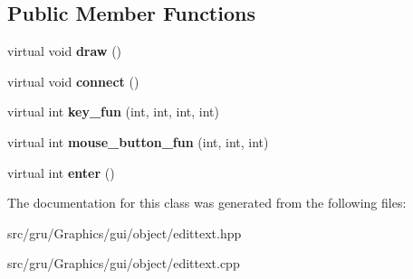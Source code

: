 \subsection*{\-Public \-Member \-Functions}
\begin{DoxyCompactItemize}
\item 
\hypertarget{classglutpp_1_1gui_1_1object_1_1edittext_a6667510174711dd4718f8f8b07b89a6e}{virtual void {\bfseries draw} ()}\label{classglutpp_1_1gui_1_1object_1_1edittext_a6667510174711dd4718f8f8b07b89a6e}

\item 
\hypertarget{classglutpp_1_1gui_1_1object_1_1edittext_aacbbfc6f239db6356d83de334f6b0bdc}{virtual void {\bfseries connect} ()}\label{classglutpp_1_1gui_1_1object_1_1edittext_aacbbfc6f239db6356d83de334f6b0bdc}

\item 
\hypertarget{classglutpp_1_1gui_1_1object_1_1edittext_a88d4a62bd971978e1b60711859b4390d}{virtual int {\bfseries key\-\_\-fun} (int, int, int, int)}\label{classglutpp_1_1gui_1_1object_1_1edittext_a88d4a62bd971978e1b60711859b4390d}

\item 
\hypertarget{classglutpp_1_1gui_1_1object_1_1edittext_ae7decbc3c95b939cd78d782c48702bec}{virtual int {\bfseries mouse\-\_\-button\-\_\-fun} (int, int, int)}\label{classglutpp_1_1gui_1_1object_1_1edittext_ae7decbc3c95b939cd78d782c48702bec}

\item 
\hypertarget{classglutpp_1_1gui_1_1object_1_1edittext_a654792733884b42cba054e6a84894876}{virtual int {\bfseries enter} ()}\label{classglutpp_1_1gui_1_1object_1_1edittext_a654792733884b42cba054e6a84894876}

\end{DoxyCompactItemize}


\-The documentation for this class was generated from the following files\-:\begin{DoxyCompactItemize}
\item 
src/gru/\-Graphics/gui/object/edittext.\-hpp\item 
src/gru/\-Graphics/gui/object/edittext.\-cpp\end{DoxyCompactItemize}
